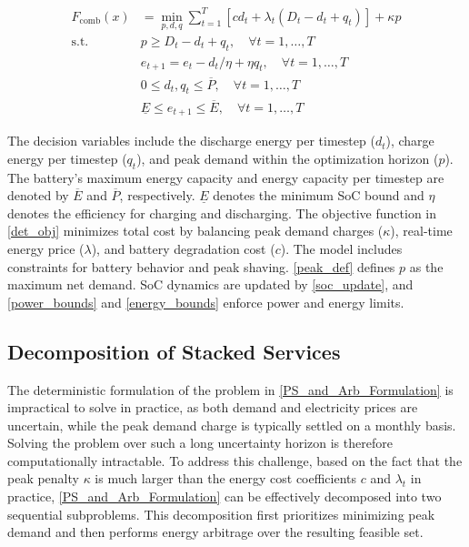 \documentclass[conference]{IEEEtran}
\begin{document}
\begin{subequations}\label{PS_and_Arb_Formulation}
\begin{align}
F_{\text{comb}}(x) &= \min_{p,d,q} \sum\nolimits_{t=1}^T 
\left[ c d_t + \lambda_t (D_t - d_t + q_t) \right] + \kappa p
\label{det_obj} \\
\text{s.t. } \quad
& p \ge D_t - d_t + q_t, \quad \forall t = 1, \dots, T
\label{peak_def} \\
& e_{t+1} = e_{t} - {d_t}/{\eta} + \eta q_t, \quad \forall t = 1, \dots, T
\label{soc_update} \\
& 0 \le d_t, q_t \le \overline{P}, \quad \forall t = 1, \dots, T
\label{power_bounds} \\
& \underline{E} \le e_{t+1} \le \overline{E}, \quad \forall t = 1, \dots, T
\label{energy_bounds}
\end{align}
\end{subequations}

The decision variables include the discharge energy per timestep ($d_t$), charge energy per timestep ($q_t$), and peak demand within the optimization horizon ($p$). The battery’s maximum energy capacity and energy capacity per timestep are denoted by $\overline{E}$ and $\overline{P}$, respectively. $\underline{E}$ denotes the minimum SoC bound and $\eta$ denotes the efficiency for charging and discharging. The objective function in \eqref{det_obj} minimizes total cost by balancing peak demand charges ($\kappa$), real-time energy price ($\lambda$), and battery degradation cost ($c$). The model includes constraints for battery behavior and peak shaving. \eqref{peak_def} defines $p$ as the maximum net demand. SoC dynamics are updated by \eqref{soc_update}, and \eqref{power_bounds} and \eqref{energy_bounds} enforce power and energy limits.


\subsection{Decomposition of Stacked Services}
The deterministic formulation of the problem in \eqref{PS_and_Arb_Formulation} is impractical to solve in practice, as both demand and electricity prices are uncertain, while the peak demand charge is typically settled on a monthly basis. Solving the problem over such a long uncertainty horizon is therefore computationally intractable. To address this challenge, based on the fact that the peak penalty $\kappa$ is much larger than the energy cost coefficients $c$ and $\lambda_t$ in practice, \eqref{PS_and_Arb_Formulation} can be effectively decomposed into two sequential subproblems. This decomposition first prioritizes minimizing peak demand and then performs energy arbitrage over the resulting feasible set.
\end{document}
